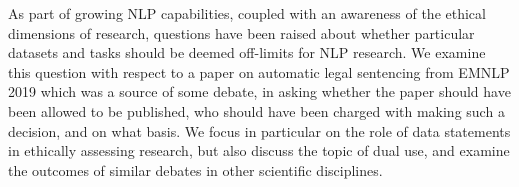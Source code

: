 As part of growing NLP capabilities, coupled with an awareness of the ethical dimensions of research, questions have been raised about whether particular datasets and tasks should be deemed off-limits for NLP research. We examine this question with respect to a paper on automatic legal sentencing from EMNLP 2019 which was a source of some debate, in asking whether the paper should have been allowed to be published, who should have been charged with making such a decision, and on what basis. We focus in particular on the role of data statements in ethically assessing research, but also discuss the topic of dual use, and examine the outcomes of similar debates in other scientific disciplines.
